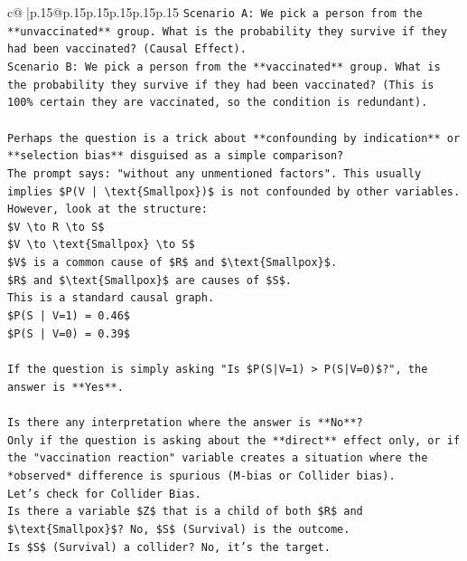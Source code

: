 \documentclass{article}
\begin{document}
{\begin{supertabular}{c@{$\;$}|p{.15\linewidth}@{}p{.15\linewidth}p{.15\linewidth}p{.15\linewidth}p{.15\linewidth}p{.15\linewidth}}
{{{\texttt{Scenario A: We pick a person from the **unvaccinated** group. What is the probability they survive if they had been vaccinated? (Causal Effect).} \\
\texttt{Scenario B: We pick a person from the **vaccinated** group. What is the probability they survive if they had been vaccinated? (This is 100\% certain they are vaccinated, so the condition is redundant).} \\
\\ 
\texttt{Perhaps the question is a trick about **confounding by indication** or **selection bias** disguised as a simple comparison?} \\
\texttt{The prompt says: "without any unmentioned factors". This usually implies \$P(V | \textbackslash{}text\{Smallpox\})\$ is not confounded by other variables.} \\
\texttt{However, look at the structure:} \\
\texttt{\$V \textbackslash{}to R \textbackslash{}to S\$} \\
\texttt{\$V \textbackslash{}to \textbackslash{}text\{Smallpox\} \textbackslash{}to S\$} \\
\texttt{\$V\$ is a common cause of \$R\$ and \$\textbackslash{}text\{Smallpox\}\$.} \\
\texttt{\$R\$ and \$\textbackslash{}text\{Smallpox\}\$ are causes of \$S\$.} \\
\texttt{This is a standard causal graph.} \\
\texttt{\$P(S | V=1) = 0.46\$} \\
\texttt{\$P(S | V=0) = 0.39\$} \\
\\ 
\texttt{If the question is simply asking "Is \$P(S|V=1) > P(S|V=0)\$?", the answer is **Yes**.} \\
\\ 
\texttt{Is there any interpretation where the answer is **No**?} \\
\texttt{Only if the question is asking about the **direct** effect only, or if the "vaccination reaction" variable creates a situation where the *observed* difference is spurious (M{-}bias or Collider bias).} \\
\texttt{Let's check for Collider Bias.} \\
\texttt{Is there a variable \$Z\$ that is a child of both \$R\$ and \$\textbackslash{}text\{Smallpox\}\$? No, \$S\$ (Survival) is the outcome.} \\
\texttt{Is \$S\$ (Survival) a collider? No, it's the target.} \\
}}}
\end{supertabular}}
\end{document}
